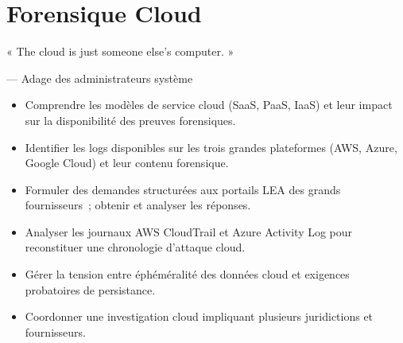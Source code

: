 
\chapter{Forensique Cloud}
\label{chap:for-cloud}

\epigraph{%
    « The cloud is just someone else's computer. »%
}{--- Adage des administrateurs système}


\begin{boxobjectifs}
\begin{itemize}
    \item Comprendre les modèles de service cloud (SaaS, PaaS, IaaS)
          et leur impact sur la disponibilité des preuves forensiques.
    \item Identifier les logs disponibles sur les trois grandes
          plateformes (AWS, Azure, Google Cloud) et leur contenu
          forensique.
    \item Formuler des demandes structurées aux portails LEA des
          grands fournisseurs~; obtenir et analyser les réponses.
    \item Analyser les journaux AWS CloudTrail et Azure Activity Log
          pour reconstituer une chronologie d'attaque cloud.
    \item Gérer la tension entre éphéméralité des données cloud
          et exigences probatoires de persistance.
    \item Coordonner une investigation cloud impliquant plusieurs
          juridictions et fournisseurs.
\end{itemize}
\end{boxobjectifs}

